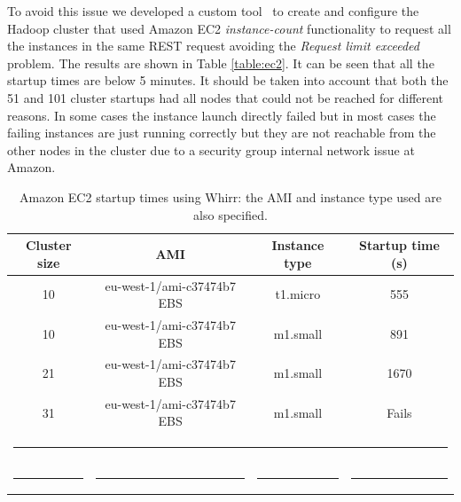 To avoid this issue we developed a custom tool~\cite{hadoopondemand} to create and configure the Hadoop cluster that used Amazon EC2 \emph{instance-count} functionality to request all the instances in the same REST request avoiding the \emph{Request limit exceeded} problem. The results are shown in Table \ref{table:ec2}. It can be seen that all the startup times are below 5 minutes. It should be taken into account that both the 51 and 101 cluster startups had all nodes that could not be reached for different reasons. In some cases the instance launch directly failed but in most cases the failing instances are just running correctly but they are not reachable from the other nodes in the cluster due to a security group internal network issue at Amazon.


\begin{table}[h!]
\caption{Amazon EC2 startup times using Whirr: the AMI and instance type used are also specified.}
\label{table:whirr}
%
\vspace{-0.5em}
%
\begin{center}
\begin{tabular}{cccc}
\toprule
Cluster size				& AMI				& Instance type		& Startup time (s) 	  \\
\midrule
10                   			& eu-west-1/ami-c37474b7 EBS	& t1.micro 		& 555   		  \\
10                   			& eu-west-1/ami-c37474b7 EBS	& m1.small		& 891			  \\
21                   			& eu-west-1/ami-c37474b7 EBS	& m1.small 		& 1670			  \\
31                   			& eu-west-1/ami-c37474b7 EBS	& m1.small 		& Fails  		  \\
%
\bottomrule
\multicolumn{4}{c}{\rule{0.98\textwidth}{0em}}\\
\rule{0.2\textwidth}{0cm} & \rule{0.4\textwidth}{0cm} & \rule{0.2\textwidth}{0cm} &  \rule{0.2\textwidth}{0cm} \\
\end{tabular}
\end{center}
\end{table}

